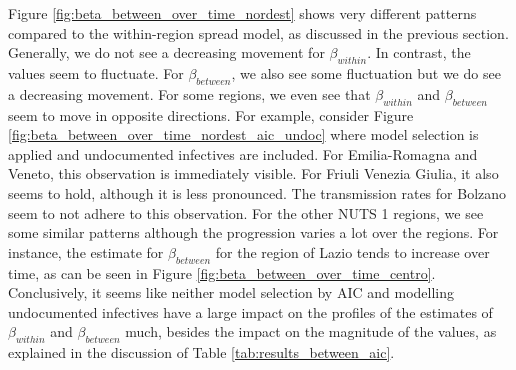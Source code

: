 \documentclass[12pt]{article}
\begin{document}
	Figure \ref{fig:beta_between_over_time_nordest} shows very different patterns compared to the within-region spread model, as discussed in the previous section. Generally, we do not see a decreasing movement for $\beta_{within}$. In contrast, the values seem to fluctuate. For $\beta_{between}$, we also see some fluctuation but we do see a decreasing movement. For some regions, we even see that $\beta_{within}$ and $\beta_{between}$ seem to move in opposite directions. For example, consider Figure \ref{fig:beta_between_over_time_nordest_aic_undoc} where model selection is applied and undocumented infectives are included. For Emilia-Romagna and Veneto, this observation is immediately visible. For Friuli Venezia Giulia, it also seems to hold, although it is less pronounced. The transmission rates for Bolzano seem to not adhere to this observation. For the other NUTS 1 regions, we see some similar patterns although the progression varies a lot over the regions. For instance, the estimate for $\beta_{between}$ for the region of Lazio tends to increase over time, as can be seen in Figure \ref{fig:beta_between_over_time_centro}. \\
	
	Conclusively, it seems like neither model selection by AIC and modelling undocumented infectives have a large impact on the profiles of the estimates of $\beta_{within}$ and $\beta_{between}$ much, besides the impact on the magnitude of the values, as explained in the discussion of Table \ref{tab:results_between_aic}.
	
	
\end{document}
